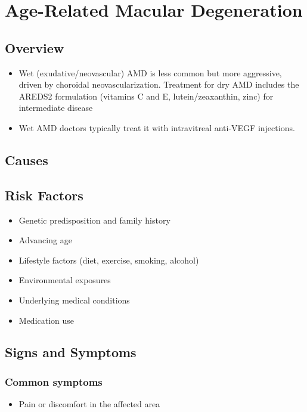 \chapter{Age-Related Macular Degeneration}
\label{sec:geriatric:Age-Related Macular Degeneration}

\section{Overview}


\begin{itemize}[noitemsep]
  \item Wet (exudative/neovascular) AMD is less common but more aggressive, driven by choroidal neovascularization. Treatment for dry AMD includes the AREDS2 formulation (vitamins C and E, lutein/zeaxanthin, zinc) for intermediate disease
  \item Wet AMD doctors typically treat it with intravitreal anti-VEGF injections.
\end{itemize}
\section{Causes}
\section{Risk Factors}

\begin{itemize}[noitemsep]
  \item Genetic predisposition and family history
  \item Advancing age
  \item Lifestyle factors (diet, exercise, smoking, alcohol)
  \item Environmental exposures
  \item Underlying medical conditions
  \item Medication use
\end{itemize}
\section{Signs and Symptoms}

\subsection{Common symptoms}
\begin{itemize}[noitemsep]
  \item Pain or discomfort in the affected area
  \end{itemize}

